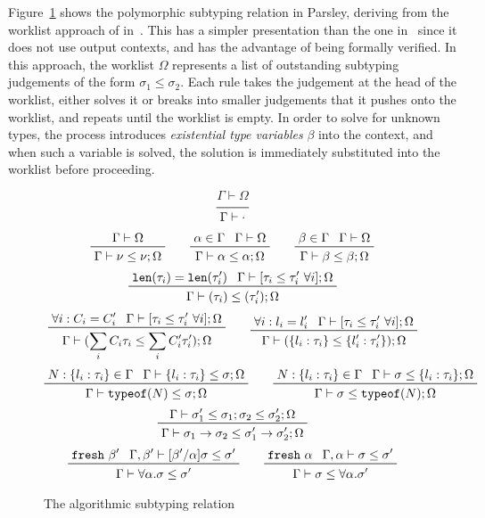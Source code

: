 \documentclass[letterpaper]{article}
\begin{document}
Figure~\ref{f:subtyping} shows the polymorphic subtyping relation in
Parsley, deriving from the worklist approach of
in~\cite{zhao2018,zhao19:bidir}.  This has a simpler presentation than
the one in~\cite{Dunfield13:bidir} since it does not use output
contexts, and has the advantage of being formally verified.  In this
approach, the worklist $\Omega$ represents a list of outstanding
subtyping judgements of the form $\sigma_1\leq\sigma_2$.  Each rule
takes the judgement at the head of the worklist, either solves it or
breaks into smaller judgements that it pushes onto the worklist, and
repeats until the worklist is empty.  In order to solve for unknown
types, the process introduces {\em existential type variables} $\beta$
into the context, and when such a variable is solved, the solution is
immediately substituted into the worklist before proceeding.

\begin{figure}
  $$ \boxed{\Gamma\vdash\Omega} $$
  $$ $$
  $$ \prfaxiom{\Gamma\vdash\cdot} $$
  $$ \prftree{\prfassumption{\Gamma\vdash\Omega}}
             {\prfassumption{\Gamma\vdash\nu\leq\nu;\Omega}}\qquad
     \prftree{\prfassumption{\alpha\in\Gamma}}
             {\prfassumption{\Gamma\vdash\Omega}}
             {\Gamma\vdash\alpha\leq\alpha;\Omega}\qquad
     \prftree{\prfassumption{\beta\in\Gamma}}
             {\prfassumption{\Gamma\vdash\Omega}}
             {\Gamma\vdash\beta\leq\beta;\Omega} $$
  $$ \prftree{\prfassumption{\texttt{len}(\tau_i)=\texttt{len}(\tau'_i)}}
             {\prfassumption{\Gamma\vdash[\tau_i\leq\tau'_i\ \forall i];\Omega}}
             {\Gamma\vdash(\tau_i)\leq(\tau'_i);\Omega} $$
  $$ \prftree{\prfassumption{\forall i:C_i=C'_i}}
             {\prfassumption{\Gamma\vdash[\tau_i\leq\tau'_i\ \forall i];\Omega}}
             {\Gamma\vdash(\sum_iC_i\tau_i\leq\sum_iC'_i\tau'_i);\Omega}\qquad
     \prftree{\prfassumption{\forall i:l_i=l'_i}}
             {\prfassumption{\Gamma\vdash[\tau_i\leq\tau'_i\ \forall i];\Omega}}
             {\Gamma\vdash(\{l_i:\tau_i\}\leq\{l'_i:\tau'_i\});\Omega} $$
  $$ \prftree{\prfassumption{N:\{l_i:\tau_i\}\in\Gamma}}
             {\prfassumption{\Gamma\vdash\{l_i:\tau_i\}\leq\sigma};\Omega}
             {\Gamma\vdash\texttt{typeof}(N)\leq\sigma;\Omega}\qquad
     \prftree{\prfassumption{N:\{l_i:\tau_i\}\in\Gamma}}
             {\prfassumption{\Gamma\vdash\sigma\leq\{l_i:\tau_i\};\Omega}}
             {\Gamma\vdash\sigma\leq\texttt{typeof}(N);\Omega} $$
  $$ \prftree{\prfassumption{\Gamma\vdash\sigma'_1\leq\sigma_1;\sigma_2\leq\sigma'_2;\Omega}}
             {\Gamma\vdash\sigma_1\rightarrow\sigma_2\leq\sigma'_1\rightarrow\sigma'_2;\Omega} $$
  $$ \prftree{\prfassumption{\texttt{fresh}\ \beta'}}
             {\prfassumption{\Gamma,\beta'\vdash[\beta'/\alpha]\sigma\leq\sigma'}}
             {\Gamma\vdash\forall\alpha.\sigma\leq\sigma'}\qquad
     \prftree{\prfassumption{\texttt{fresh}\ \alpha}}
             {\prfassumption{\Gamma,\alpha\vdash\sigma\leq\sigma'}}
             {\Gamma\vdash\sigma\leq\forall\alpha.\sigma'} $$
  \caption{The algorithmic subtyping relation}
  \label{f:subtyping}
\end{figure}
\end{document}
